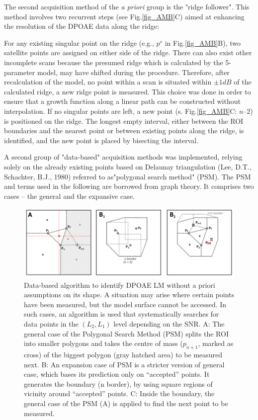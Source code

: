 \documentclass[journal,twoside,web]{ieeecolor2}
\begin{document}
The second acquisition method of the \textit{a priori} group is the "ridge follower".
This method involves two recurrent steps (see Fig.\ref{fig_AMB}C) aimed at enhancing the resolution of the DPOAE data along the ridge:
\begin{algorithmic}[1]
\STATE For any existing singular point on the ridge (e.g., $p^s$ in Fig.\ref{fig_AMB}B), two satellite points are assigned on either side of the ridge.
There can also exist other incomplete scans because the presumed ridge which is calculated by the 5-parameter model, may have shifted during the procedure.
Therefore, after recalculation of the model, no point within a scan is situated within $\pm1 dB$ of the calculated ridge, a new ridge point is measured.
This choice was done in order to ensure that a growth function along a linear path can be constructed without interpolation.
\STATE If no singular points are left, a new point (s.
Fig.\ref{fig_AMB}C: $n – 2$) is positioned on the ridge.
The longest empty interval, either between the ROI boundaries and the nearest point or between existing points along the ridge, is identified, and the new point is placed by bisecting the interval.
\end{algorithmic} 

A second group of "data-based" acquisition methods was implemented, relying solely on the already existing points based on Delaunay triangulation (Lee, D.T., Schachter, B.J., 1980) referred to as"polygonal search method" (PSM).
The PSM and terms used in the following are borrowed from graph theory.
It comprises two cases – the general and the expansive case.

\begin{figure}
\includegraphics[width=\textwidth]{Fig_ALM_DataBased} %
\caption{Data-based algorithm to identify DPOAE LM without a priori assumptions on its shape.
A situation may arise where certain points have been measured, but the model surface cannot be accessed.
In such cases, an algorithm is used that systematically searches for data points in the $(L_2, L_1)$ level depending on the SNR.
A: The general case of the Polygonal Search Method (PSM) splits the ROI into smaller polygons and takes the centre of mass ($p_{n+1}$, marked as cross) of the biggest polygon (gray hatched area) to be measured next.
B: An expansion case of PSM is a stricter version of general case, which bases its prediction only on “accepted” points.
It generates the boundary (n border), by using square regions of vicinity around “accepted” points.
C: Inside the boundary, the general case of the PSM (A) is applied to find the next point to be measured.}
\label{fig_ADB}
\end{figure}
\end{document}
